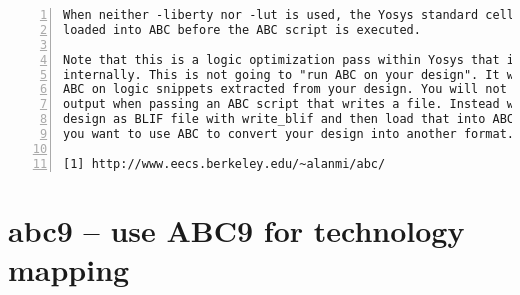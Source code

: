 \begin{lstlisting}[numbers=left,frame=single]
When neither -liberty nor -lut is used, the Yosys standard cell library is
loaded into ABC before the ABC script is executed.

Note that this is a logic optimization pass within Yosys that is calling ABC
internally. This is not going to "run ABC on your design". It will instead run
ABC on logic snippets extracted from your design. You will not get any useful
output when passing an ABC script that writes a file. Instead write your full
design as BLIF file with write_blif and then load that into ABC externally if
you want to use ABC to convert your design into another format.

[1] http://www.eecs.berkeley.edu/~alanmi/abc/
\end{lstlisting}

\section{abc9 -- use ABC9 for technology mapping}
\label{cmd:abc9}
